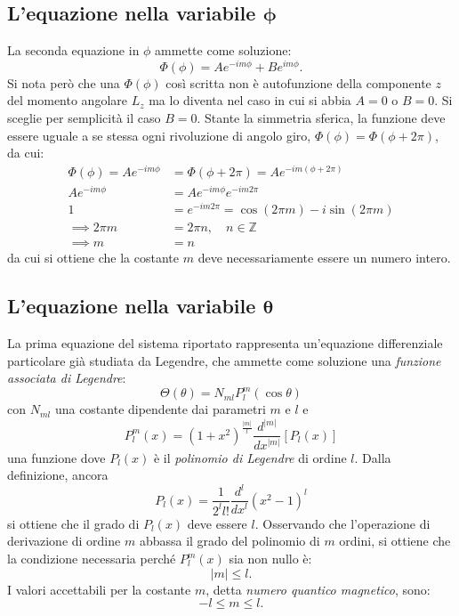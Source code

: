 \documentclass[a4paper,11pt]{report}
\begin{document}
\subsection{L'equazione nella variabile $\bm{\phi}$}
La seconda equazione in $\phi$ ammette come soluzione:
\begin{equation}
\Phi(\phi) = Ae^{-im\phi} + Be^{im\phi}.
\end{equation}
Si nota però che una $\Phi(\phi)$ così scritta non è autofunzione della componente $z$ del momento angolare $L_z$ ma lo diventa nel caso in cui si abbia $A  = 0$ o $B = 0$. Si sceglie per semplicità il caso $B = 0$. Stante la simmetria sferica, la funzione deve essere uguale a se stessa ogni rivoluzione di angolo giro, $\Phi(\phi) = \Phi(\phi + 2\pi)$, da cui:
\begin{equation}
\begin{aligned}
\Phi(\phi) = Ae^{-im\phi} &= \Phi(\phi + 2\pi) = Ae^{-im(\phi + 2\pi)} \\
Ae^{-im\phi} &= Ae^{-im\phi}e^{-im2\pi} \\
1 &= e^{-im2\pi} = \cos(2\pi m) - i\sin(2\pi m) \\
\implies 2\pi m &= 2 \pi n, \quad n \in \mathbb{Z} \\
\implies m &= n
\end{aligned}
\end{equation}
da cui si ottiene che la costante $m$ deve necessariamente essere un numero intero.

\subsection{L'equazione nella variabile $\bm{\theta}$}
La prima equazione del sistema riportato rappresenta un'equazione differenziale particolare già studiata da Legendre, che ammette come soluzione una \textit{funzione associata di Legendre}:
\begin{equation}
\Theta(\theta) = N_{ml} P_l^m(\cos\theta)
\end{equation}
con $N_{ml}$ una costante dipendente dai parametri $m$ e $l$ e 
\begin{equation}
P_l^m(x) = (1+x^2)^{\frac{|m|}{l}} \frac{d^{|m|}}{dx^{|m|}}\left[P_l(x)\right]
\end{equation}
una funzione dove $P_l(x)$ è il \textit{polinomio di Legendre} di ordine $l$. Dalla definizione, ancora
\begin{equation}
P_l(x) = \frac{1}{2^l l!} \frac{d^{l}}{dx^{l}}(x^2-1)^l
\end{equation}
si ottiene che il grado di $P_l(x)$ deve essere $l$. Osservando che l'operazione di derivazione di ordine $m$ abbassa il grado del polinomio di $m$ ordini, si ottiene che la condizione necessaria perché $P_l^m(x)$ sia non nullo è:
\begin{equation}
|m| \leq l.
\end{equation}
I valori accettabili per la costante $m$, detta \textit{numero quantico magnetico}, sono:
\begin{equation}
-l \leq m \leq l.
\end{equation}
\end{document}
